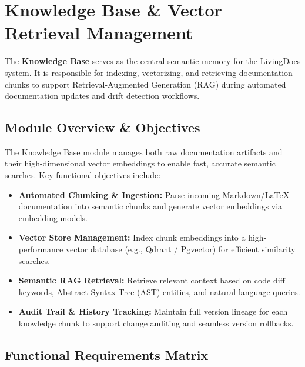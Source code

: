 \section{Knowledge Base \& Vector Retrieval Management}

The \textbf{Knowledge Base} serves as the central semantic memory for the LivingDocs system. It is responsible for indexing, vectorizing, and retrieving documentation chunks to support Retrieval-Augmented Generation (RAG) during automated documentation updates and drift detection workflows.

\subsection{Module Overview \& Objectives}
The Knowledge Base module manages both raw documentation artifacts and their high-dimensional vector embeddings to enable fast, accurate semantic searches. Key functional objectives include:
\begin{itemize}
    \item \textbf{Automated Chunking \& Ingestion:} Parse incoming Markdown/LaTeX documentation into semantic chunks and generate vector embeddings via embedding models.
    \item \textbf{Vector Store Management:} Index chunk embeddings into a high-performance vector database (e.g., Qdrant / Pgvector) for efficient similarity searches.
    \item \textbf{Semantic RAG Retrieval:} Retrieve relevant context based on code diff keywords, Abstract Syntax Tree (AST) entities, and natural language queries.
    \item \textbf{Audit Trail \& History Tracking:} Maintain full version lineage for each knowledge chunk to support change auditing and seamless version rollbacks.
\end{itemize}

\subsection{Functional Requirements Matrix}

